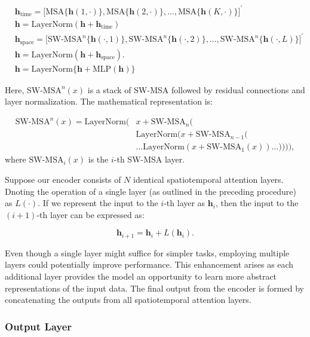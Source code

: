 \documentclass[review]{elsarticle}
\begin{document}
\begin{align}
		&\boldsymbol{h}_{\text{time}} = \big[\text{MSA}\{\boldsymbol{h}(1,\cdot)\}, \text{MSA}\{\boldsymbol{h}(2,\cdot)\}, \ldots, \text{MSA}\{\boldsymbol{h}(K,\cdot)\}\big]^{\prime}\\
		&\boldsymbol{h}= \text{LayerNorm}(\boldsymbol{h}+ \boldsymbol{h}_{\text{time}})\\
		&\boldsymbol{h}_{\text{space}} = \big[\text{SW-MSA}^n\{\boldsymbol{h}(\cdot, 1)\}, \text{SW-MSA}^n\{\boldsymbol{h}(\cdot, 2)\}, \ldots, \text{SW-MSA}^n\{\boldsymbol{h}(\cdot, L)\}\big]^{\prime}\\
		&\boldsymbol{h}= \text{LayerNorm}(\boldsymbol{h}+ \boldsymbol{h}_{\text{space}}).\\
		& \boldsymbol{h} = \text{LayerNorm}\{\boldsymbol{h} + \text{MLP}(\boldsymbol{h})\}
\end{align}

Here, $\text{SW-MSA}^n(x)$ is a stack of SW-MSA followed by residual connections and layer normalization. The mathematical representation is: 


\begin{align}
\text{SW-MSA}^n(x) = \text{LayerNorm}(&x + \text{SW-MSA}_{n}( \\
&\text{LayerNorm}(x + \text{SW-MSA}_{n-1}( \\
&\ldots \text{LayerNorm}(x + \text{SW-MSA}_{1}(x))\ldots )))),
\end{align}
where $\text{SW-MSA}_i(x)$ is the $i$-th SW-MSA layer. 

Suppose our encoder consists of $N$ identical spatiotemporal attention layers. Dnoting the operation of a single layer (as outlined in the preceding procedure) as $L(\cdot)$. If we represent the input to the $i$-th layer as $\boldsymbol{h}_i$, then the input to the $(i+1)$-th layer can be expressed as:

\begin{equation}
    \boldsymbol{h}_{i+1} = \boldsymbol{h}_i + L(\boldsymbol{h}_i).
\end{equation}

Even though a single layer might suffice for simpler tasks, employing multiple layers could potentially improve performance. This enhancement arises as each additional layer provides the model an opportunity to learn more abstract representations of the input data. The final output from the encoder is formed by concatenating the outputs from all spatiotemporal attention layers.

\subsubsection*{Output Layer}
\end{document}
